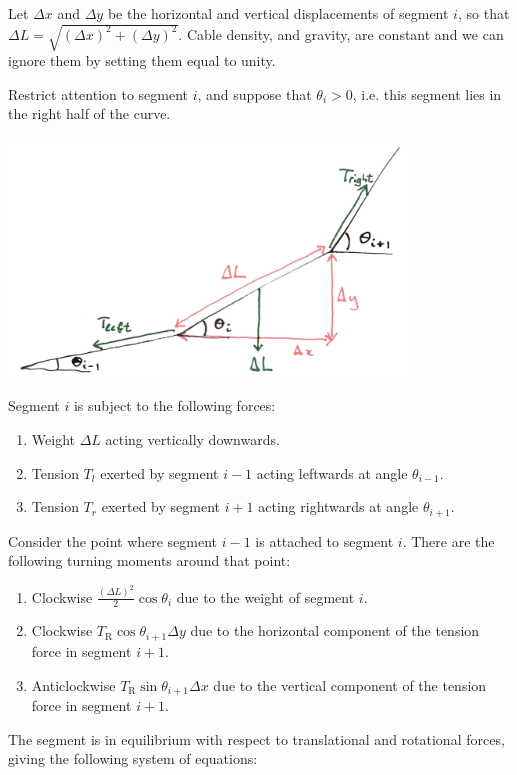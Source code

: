 \documentclass[12pt]{article}
\newcommand{\Tr}{T_{\text{R}}}
\begin{document}
Let $\Delta x$ and $\Delta y$ be the horizontal and vertical displacements of segment $i$, so that
$\Delta L = \sqrt{(\Delta x)^2 + (\Delta y)^2}$. Cable density, and gravity, are constant and we
can ignore them by setting them equal to unity.

Restrict attention to segment $i$, and suppose that $\theta_i > 0$, i.e. this segment lies in the
right half of the curve.

\begin{mdframed}
\includegraphics[width=300pt]{img/misc--puzzles--hanging-cable.png}
\end{mdframed}


Segment $i$ is subject to the following forces:
\begin{enumerate}
\item Weight $\Delta L$ acting vertically downwards.
\item Tension $T_l$ exerted by segment $i-1$ acting leftwards at angle $\theta_{i-1}$.
\item Tension $T_r$ exerted by segment $i+1$ acting rightwards at angle $\theta_{i+1}$.
\end{enumerate}
Consider the point where segment $i-1$ is attached to segment $i$. There are the following turning
moments around that point:
\begin{enumerate}
\item Clockwise $\frac{(\Delta L)^2}{2}\cos\theta_i$ due to the weight of segment $i$.
\item Clockwise $\Tr\cos\theta_{i+1}\Delta y$ due to the horizontal component of the tension force
  in segment $i+1$.
\item Anticlockwise $\Tr\sin\theta_{i+1}\Delta x$ due to the vertical component of the tension
  force in segment $i+1$.
\end{enumerate}

The segment is in equilibrium with respect to translational and rotational forces, giving the
following system of equations:
\end{document}
